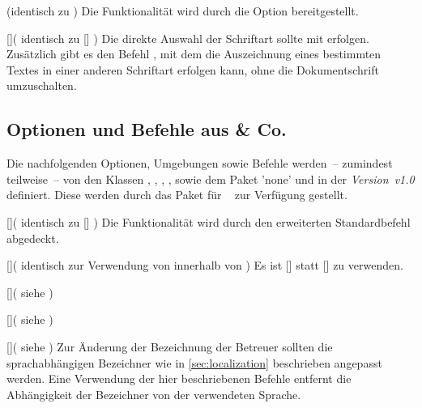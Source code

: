 \begin{Bundle*}{}
\begin{Declaration}{}(identisch zu )
\printdeclarationlist%
%
Die Funktionalität wird durch die Option  bereitgestellt.
\end{Declaration}

\begin{Declaration}{[]}(%
  identisch zu []%
)
\printdeclarationlist%
%
Die direkte Auswahl der Schriftart sollte mit  erfolgen. 
Zusätzlich gibt es den Befehl , mit dem die Auszeichnung 
eines bestimmten Textes in einer anderen Schriftart erfolgen kann, ohne die 
Dokumentschrift umzuschalten.
\end{Declaration}
%


\subsection{Optionen und Befehle aus  \& Co.}
%
Die nachfolgenden Optionen, Umgebungen sowie Befehle werden~-- zumindest 
teilweise~-- von den Klassen , , 
, ,  sowie dem Paket 
'none' und \TUDScript in der \emph{Version~v1.0} definiert. 
Diese werden durch das Paket  für \TUDScript~\vTUDScript{} 
zur Verfügung gestellt.

\begin{Declaration}{[]}(%
  identisch zu []%
)
\printdeclarationlist%
%
Die Funktionalität wird durch den erweiterten Standardbefehl  
abgedeckt.
\end{Declaration}

\begin{Declaration}{[]}(%
  identisch zur Verwendung von  innerhalb von %
)
\printdeclarationlist%
%
Es ist []
statt [] zu verwenden.
\end{Declaration}

\begin{Declaration}{[]}(%
  siehe %
)
\begin{Declaration}{[]}(%
  siehe %
)
\begin{Declaration}{[]}(%
  siehe %
)
\printdeclarationlist%
%
Zur Änderung der Bezeichnung der Betreuer sollten die sprachabhängigen 
Bezeichner wie in \autoref{sec:localization} beschrieben angepasst werden. Eine 
Verwendung der hier beschriebenen Befehle entfernt die Abhängigkeit der 
Bezeichner von der verwendeten Sprache.
\end{Declaration}
\end{Declaration}
\end{Declaration}


\end{Bundle*}
